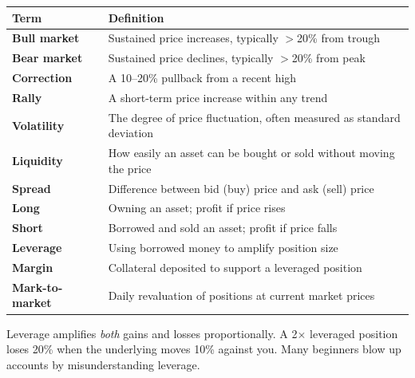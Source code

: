 \begin{center}
\begin{tabular}{>{\bfseries}p{3.5cm} p{9.5cm}}
\toprule
Term & Definition \\
\midrule
Bull market & Sustained price increases, typically $>$20\% from trough \\
Bear market & Sustained price declines, typically $>$20\% from peak \\
Correction & A 10--20\% pullback from a recent high \\
Rally & A short-term price increase within any trend \\
Volatility & The degree of price fluctuation, often measured as standard deviation \\
Liquidity & How easily an asset can be bought or sold without moving the price \\
Spread & Difference between bid (buy) price and ask (sell) price \\
Long & Owning an asset; profit if price rises \\
Short & Borrowed and sold an asset; profit if price falls \\
Leverage & Using borrowed money to amplify position size \\
Margin & Collateral deposited to support a leveraged position \\
Mark-to-market & Daily revaluation of positions at current market prices \\
\bottomrule
\end{tabular}
\end{center}

\begin{warningbox}
Leverage amplifies \emph{both} gains and losses proportionally. A 2$\times$ leveraged position
loses 20\% when the underlying moves 10\% against you. Many beginners blow up accounts by
misunderstanding leverage.
\end{warningbox}
